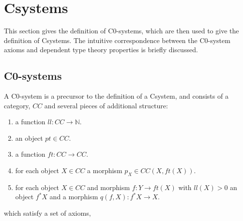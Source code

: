 \section{Csystems}
This section gives the definition of C0-systems, which are then used to give the
definition of Csystems. The intuitive correspondence between the C0-system
axioms and dependent type theory properties is briefly discussed.

\subsection{C0-systems}
A C0-system is a precursor to the definition of a Csystem, and consists of a
category, $CC$ and several pieces of additional structure:
\begin{enumerate}
    \item a function $ll: CC\to \mathbb{N}$.
    \item an object $pt\in CC$.
    \item a function $ft: CC\to CC$.
    \item for each object $X\in CC$ a morphism $p_X\in CC(X, ft(X))$.
    \item for each object $X\in CC$ and morphism $f: Y\to ft(X)$ with $ll(X) >
    0$ an object $f^*X$ and a morphism $q(f, X) : f^*X\to X$.
\end{enumerate}
which satisfy a set of axioms,
